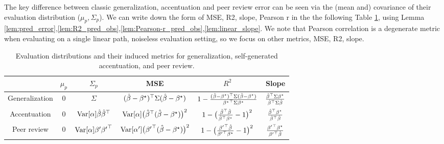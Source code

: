 \documentclass{article}
\theoremstyle{plain}
\theoremstyle{definition}
\theoremstyle{remark}
\begin{document}
The key difference between classic generalization, accentuation and peer
review error can be seen via the (mean and) covariance of their evaluation
distribution ($\mu_p,\Sigma_p$). We can write down the form of MSE, R2, slope,
Pearson r in the the following Table \ref{tab:evaluation-metrics}, using Lemma \ref{lem:pred_error},\ref{lem:R2_pred_obs},\ref{lem:Pearson-r_pred_obs},\ref{lem:linear_slope}. 
We note that Pearson correlation is a degenerate metric when evaluating
on a single linear path, noiseless evaluation setting, so we focus
on other metrics, MSE, R2, slope.
\begin{table}[H]
\centering
\small
\begin{tabular}{c|c|c|c|c|c}
\hline
 & $\mu_{p}$ & $\Sigma_{p}$ & MSE & $R^2$ & Slope \tabularnewline %
\hline
\hline
Generalization & $0$ & $\Sigma$ & $(\hat{\beta}-{\beta^{\star}})^{\top}\Sigma(\hat{\beta}-{\beta^{\star}})$ & $1-\frac{(\hat{\beta}-{\beta^{\star}})^{\top}\Sigma(\hat{\beta}-{\beta^{\star}})}{{{\beta^{\star}}}^{\top}\Sigma{\beta^{\star}}}$ & $\frac{{\hat{\beta}}^{\top}\Sigma{\beta^{\star}}}{{\hat{\beta}}^{\top}\Sigma\hat{\beta}}$ \tabularnewline %
\hline
Accentuation & $0$ & $\mathrm{Var}[\alpha]\hat{\beta}{\hat{\beta}}^{\top}$ & $\mathrm{Var}[\alpha]\big({\hat{\beta}}^{\top}(\hat{\beta}-{\beta^{\star}})\big)^{2}$ & $1-\big(\frac{{\hat{\beta}}^{\top}\hat{\beta}}{{\hat{\beta}}^{\top}{\beta^{\star}}}-1\big)^{2}$ & $\frac{{\hat{\beta}}^{\top}{\beta^{\star}}}{{\hat{\beta}}^{\top}\hat{\beta}}$ \tabularnewline %
\hline
Peer review & $0$ & $\mathrm{Var}[\alpha]{\beta^{\prime}}{{\beta^{\prime}}}^{\top}$ & $\mathrm{Var}[\alpha^{\prime}]\big({{\beta^{\prime}}}^{\top}(\hat{\beta}-{\beta^{\star}})\big)^{2}$ & $1-\big(\frac{{{\beta^{\prime}}}^{\top}\hat{\beta}}{{{\beta^{\prime}}}^{\top}{\beta^{\star}}}-1\big)^{2}$ & $\frac{{{\beta^{\prime}}}^{\top}{\beta^{\star}}}{{{\beta^{\prime}}}^{\top}\hat{\beta}}$ \tabularnewline %
\hline
\end{tabular}
\caption{Evaluation distributions and their induced metrics for generalization, self-generated accentuation, and peer review.}
\label{tab:evaluation-metrics}
\end{table}

\end{document}
